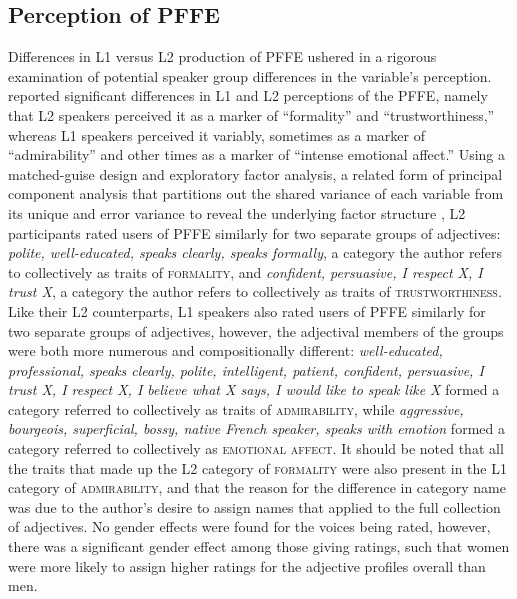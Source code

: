 \documentclass[output=paper,colorlinks,citecolor=brown,draftmode]{langscibook}
\begin{document}
\subsection{Perception of PFFE}
Differences in L1 versus L2 production of PFFE ushered in a rigorous examination of potential speaker group differences in the variable’s perception. \citet{dalola2016perception} reported significant differences in L1 and L2 perceptions of the PFFE, namely that L2 speakers perceived it as a marker of “formality” and “trustworthiness,” whereas L1 speakers perceived it variably, sometimes as a marker of “admirability” and other times as a marker of “intense emotional affect.” Using a matched-guise design and exploratory factor analysis, a related form of principal component analysis that partitions out the shared variance of each variable from its unique and error variance to reveal the underlying factor structure \citep{osborne2009best},  L2 participants rated users of PFFE similarly for two separate groups of adjectives: \emph{polite, well-educated, speaks clearly, speaks formally}, a category the author refers to collectively as traits of \textsc{formality}, and \emph{confident, persuasive, I respect X, I trust X}, a category the author refers to collectively as traits of \textsc{trustworthiness}. Like their L2 counterparts, L1 speakers also rated users of PFFE similarly for two separate groups of adjectives, however, the adjectival members of the groups were both more numerous and compositionally different: \emph{well-educated, professional, speaks clearly, polite, intelligent, patient, confident, persuasive, I trust X, I respect X, I believe what X says, I would like to speak like X} formed a category referred to collectively as traits of \textsc{admirability}, while \emph{aggressive, bourgeois, superficial, bossy, native French speaker, speaks with emotion} formed a category referred to collectively as \textsc{emotional affect}. It should be noted that all the traits that made up the L2 category of \textsc{formality} were also present in the L1 category of \textsc{admirability}, and that the reason for the difference in category name was due to the author’s desire to assign names that applied to the full collection of adjectives. No gender effects were found for the voices being rated, however, there was a significant gender effect among those giving ratings, such that women were more likely to assign higher ratings for the adjective profiles overall than men.
\end{document}
